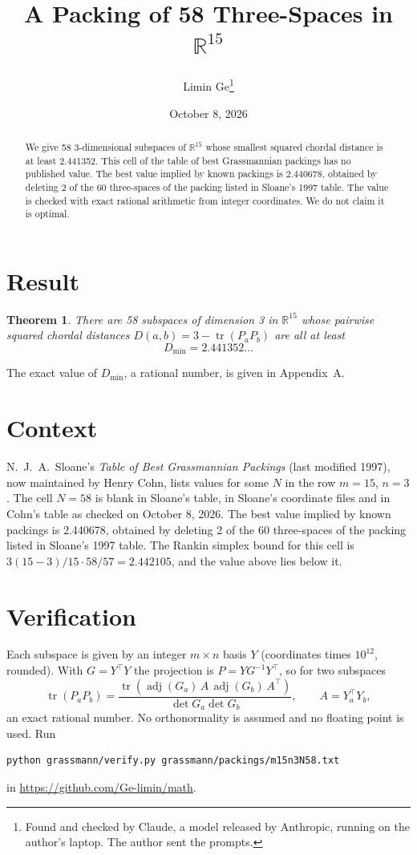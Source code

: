 \documentclass[11pt,a4paper]{article}
\title{A Packing of 58 Three-Spaces in $\mathbb{R}^{15}$}
\author{Limin Ge\thanks{Found and checked by Claude, a model released by Anthropic, running on the author's laptop. The author sent the prompts.}}
\date{October 8, 2026}
\newtheorem*{theorem}{Theorem}
\begin{document}
\maketitle
\begin{abstract}
We give 58 3-dimensional subspaces of $\mathbb{R}^{15}$ whose smallest squared chordal distance is at least 2.441352. This cell of the table of best Grassmannian packings has no published value. The best value implied by known packings is 2.440678, obtained by deleting 2 of the 60 three-spaces of the packing listed in Sloane's 1997 table. The value is checked with exact rational arithmetic from integer coordinates. We do not claim it is optimal.
\end{abstract}

\section{Result}
\begin{theorem}
There are 58 subspaces of dimension 3 in $\mathbb{R}^{15}$ whose pairwise squared chordal distances $D(a,b) = 3 - \operatorname{tr}(P_aP_b)$ are all at least
\[ D_{\min} = 2.441352\ldots \]
\end{theorem}
The exact value of $D_{\min}$, a rational number, is given in Appendix~A.


\section{Context}
N.~J.~A.~Sloane's \emph{Table of Best Grassmannian Packings} (last modified 1997), now maintained by Henry Cohn, lists values for some $N$ in the row $m=15$, $n=3$. The cell $N=58$ is blank in Sloane's table, in Sloane's coordinate files and in Cohn's table as checked on October 8, 2026. The best value implied by known packings is 2.440678, obtained by deleting 2 of the 60 three-spaces of the packing listed in Sloane's 1997 table. The Rankin simplex bound for this cell is $3(15-3)/15\cdot 58/57 = 2.442105$, and the value above lies below it.


\section{Verification}
Each subspace is given by an integer $m\times n$ basis $Y$ (coordinates times $10^{12}$, rounded). With $G=Y^\top Y$ the projection is $P=YG^{-1}Y^\top$, so for two subspaces
\[ \operatorname{tr}(P_aP_b)=\frac{\operatorname{tr}(\operatorname{adj}(G_a)\,A\,\operatorname{adj}(G_b)\,A^\top)}{\det G_a\det G_b},\qquad A=Y_a^\top Y_b, \]
an exact rational number. No orthonormality is assumed and no floating point is used. Run
\begin{verbatim}
python grassmann/verify.py grassmann/packings/m15n3N58.txt
\end{verbatim}
in \url{https://github.com/Ge-limin/math}.
\end{document}
